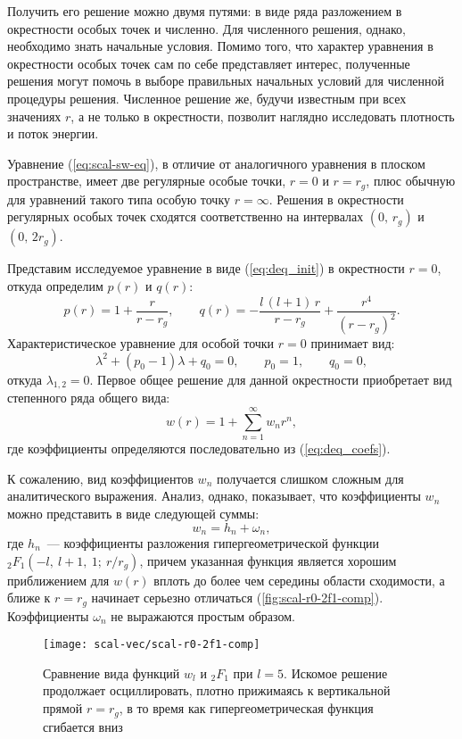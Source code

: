 \documentclass[\docroot/reports/draft/report.tex]{subfiles}
\begin{document}
        Получить его решение можно двумя путями: в виде ряда разложением в окрестности особых точек и численно. Для численного решения, однако, необходимо знать начальные условия. Помимо того, что характер уравнения в окрестности особых точек сам по себе представляет интерес, полученные решения могут помочь в выборе правильных начальных условий для численной процедуры решения. Численное решение же, будучи известным при всех значениях $r$, а не только в окрестности, позволит наглядно исследовать плотность и поток энергии.

        Уравнение (\ref{eq:scal-sw-eq}), в отличие от аналогичного уравнения в плоском пространстве, имеет две регулярные особые точки, $r = 0$ и $r = r_g$, плюс обычную для уравнений такого типа особую точку $r = \infty$. Решения в окрестности регулярных особых точек сходятся соответственно на интервалах $(0,\,r_g)$ и $(0,\,2r_g)$.

        Представим исследуемое уравнение в виде (\ref{eq:deq_init}) в окрестности $r = 0$, откуда определим $p(r)$ и $q(r)$:
        \begin{equation}
            p(r) = 1 + \frac{r}{r - r_g}, \qquad
            q(r) = -\frac{l\,(l+1)\,r}{r-r_g} + \frac{r^4}{(r-r_g)^2} .
        \end{equation}
        Характеристическое уравнение для особой точки $r = 0$ принимает вид:
        \begin{equation}
            \lambda^2 + (p_0 - 1) \lambda + q_0 = 0, \qquad
            p_0 = 1, \qquad q_0 = 0 ,
        \end{equation}
        откуда $\lambda_{1,2} = 0$. Первое общее решение для данной окрестности приобретает вид степенного ряда общего вида:
        \begin{equation}
            w(r) = 1 + \sum\limits_{n = 1}^\infty w_n r^n ,
        \end{equation}
        где коэффициенты определяются последовательно из (\ref{eq:deq_coefs}).

        К сожалению, вид коэффициентов $w_n$ получается слишком сложным для аналитического выражения. Анализ, однако, показывает, что коэффициенты $w_n$ можно представить в виде следующей суммы:
        \begin{equation}
            w_n = h_n + \omega_n,
        \end{equation}
        где $h_n$~--- коэффициенты разложения гипергеометрической функции ${}_2F_1(-l,\ l+1,\ 1;\ r / r_g)$, причем указанная функция является хорошим приближением для $w(r)$ вплоть до более чем середины области сходимости, а ближе к $r = r_g$ начинает серьезно отличаться (\autoref{fig:scal-r0-2f1-comp}). Коэффициенты $\omega_n$ не выражаются простым образом.
        \begin{figure}[!htb]%
            \centering\texttt{[image: scal-vec/scal-r0-2f1-comp]}%
            \caption[]{Сравнение вида функций $w_l$ и ${}_2F_1$ при $l = 5$. Искомое решение продолжает осциллировать, плотно прижимаясь к вертикальной прямой $r = r_g$, в то время как гипергеометрическая функция сгибается вниз}%
            \label{fig:scal-r0-2f1-comp}%
        \end{figure}
\end{document}
